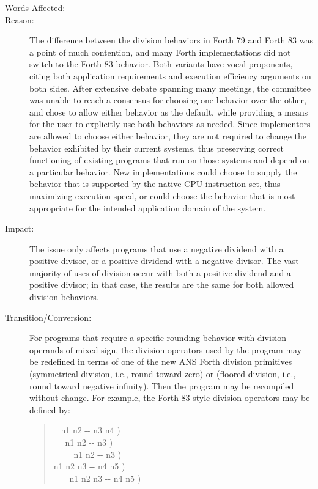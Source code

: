 \begin{description}
\item[Words Affected:]
	\word{/}				
		\word{*/}

\item[Reason:]
	The difference between the division behaviors in Forth 79 and
	Forth 83 was a point of much contention, and many Forth
	implementations did not switch to the Forth 83 behavior. Both
	variants have vocal proponents, citing both application
	requirements and execution efficiency arguments on both sides.
	After extensive debate spanning many meetings, the committee was
	unable to reach a consensus for choosing one behavior over the
	other, and chose to allow either behavior as the default, while
	providing a means for the user to explicitly use both behaviors
	as needed. Since implementors are allowed to choose either
	behavior, they are not required to change the behavior exhibited
	by their current systems, thus preserving correct functioning of
	existing programs that run on those systems and depend on a
	particular behavior. New implementations could choose to supply
	the behavior that is supported by the native CPU instruction set,
	thus maximizing execution speed, or could choose the behavior
	that is most appropriate for the intended application domain of
	the system.

\item[Impact:]
	The issue only affects programs that use a negative dividend with
	a positive divisor, or a positive dividend with a negative divisor.
	The vast majority of uses of division occur with both a positive
	dividend and a positive divisor; in that case, the results are the
	same for both allowed division behaviors.

\item[Transition/Conversion:]
	For programs that require a specific rounding behavior with division
	operands of mixed sign, the division operators used by the program
	may be redefined in terms of one of the new ANS Forth division
	primitives  (symmetrical division, i.e., round toward
	zero) or  (floored division, i.e., round toward
	negative infinity). Then the program may be recompiled without
	change. For example, the Forth 83 style division operators may be
	defined by:
	\begin{quote}\ttfamily
		\word{:} ~  n1 n2 -{}- n3 n4 ) ~~
			    \word{;} \\
		\word{:} ~~  n1 n2 -{}- n3 ) ~~~~~
			   \word{;} \\
		\word{:} \word{/}~~~~  n1 n2 -{}- n3 ) ~~~~~
			    \word{;} \\
		\word{:}   n1 n2 n3 -{}- n4 n5 )
			    \word{;} \\
		\word{:} \word{*/}~~~  n1 n2 n3 -{}- n4 n5 )
			    \word{;} \\
	\end{quote}
\end{description}



